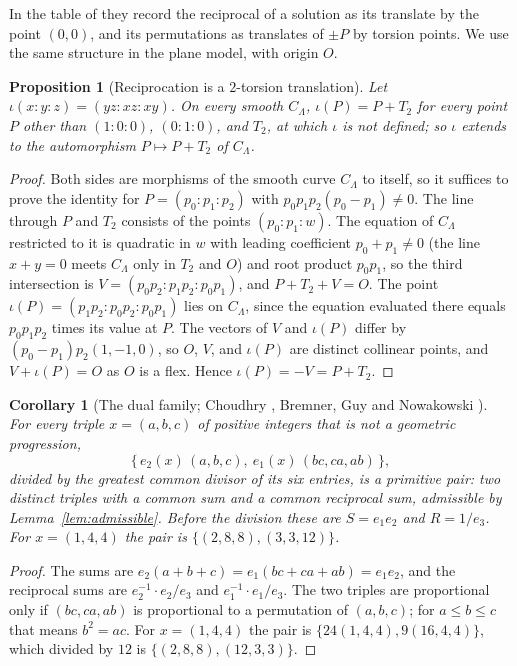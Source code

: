\documentclass[11pt]{amsart}
\newtheorem{proposition}[theorem]{Proposition}
\newtheorem{corollary}[theorem]{Corollary}
\theoremstyle{definition}
\theoremstyle{remark}
\begin{document}
In the table of \cite[\S4, p.~120]{bgn1993} they record the reciprocal of a solution as its translate by the point $(0,0)$, and its permutations as translates of $\pm P$ by torsion points. We use the same structure in the plane model, with origin $O$.

\begin{proposition}[Reciprocation is a $2$-torsion translation]\label{prop:dual}
Let $\iota(x:y:z)=(yz:xz:xy)$. On every smooth $C_\Lambda$, $\iota(P)=P+T_2$ for every point $P$ other than $(1:0:0)$, $(0:1:0)$, and $T_2$, at which $\iota$ is not defined; so $\iota$ extends to the automorphism $P\mapsto P+T_2$ of $C_\Lambda$.
\end{proposition}

\begin{proof}
Both sides are morphisms of the smooth curve $C_\Lambda$ to itself, so it suffices to prove the identity for $P=(p_0:p_1:p_2)$ with $p_0p_1p_2(p_0-p_1)\ne0$. The line through $P$ and $T_2$ consists of the points $(p_0:p_1:w)$. The equation of $C_\Lambda$ restricted to it is quadratic in $w$ with leading coefficient $p_0+p_1\ne0$ (the line $x+y=0$ meets $C_\Lambda$ only in $T_2$ and $O$) and root product $p_0p_1$, so the third intersection is $V=(p_0p_2:p_1p_2:p_0p_1)$, and $P+T_2+V=O$. The point $\iota(P)=(p_1p_2:p_0p_2:p_0p_1)$ lies on $C_\Lambda$, since the equation evaluated there equals $p_0p_1p_2$ times its value at $P$. The vectors of $V$ and $\iota(P)$ differ by $(p_0-p_1)p_2(1,-1,0)$, so $O$, $V$, and $\iota(P)$ are distinct collinear points, and $V+\iota(P)=O$ as $O$ is a flex. Hence $\iota(P)=-V=P+T_2$.
\end{proof}

\begin{corollary}[{The dual family; Choudhry \cite[\S4.1, p.~748]{choudhry2011}, Bremner, Guy and Nowakowski \cite[p.~117]{bgn1993}}]\label{cor:dual}
For every triple $x=(a,b,c)$ of positive integers that is not a geometric progression,
\[
  \big\{\,e_2(x)\,(a,b,c),\ e_1(x)\,(bc,ca,ab)\,\big\},
\]
divided by the greatest common divisor of its six entries, is a primitive pair: two distinct triples with a common sum and a common reciprocal sum, admissible by Lemma~\ref{lem:admissible}. Before the division these are $S=e_1e_2$ and $R=1/e_3$. For $x=(1,4,4)$ the pair is $\{(2,8,8),(3,3,12)\}$.
\end{corollary}

\begin{proof}
The sums are $e_2(a+b+c)=e_1(bc+ca+ab)=e_1e_2$, and the reciprocal sums are $e_2^{-1}\cdot e_2/e_3$ and $e_1^{-1}\cdot e_1/e_3$. The two triples are proportional only if $(bc,ca,ab)$ is proportional to a permutation of $(a,b,c)$; for $a\le b\le c$ that means $b^2=ac$. For $x=(1,4,4)$ the pair is $\{24(1,4,4),9(16,4,4)\}$, which divided by $12$ is $\{(2,8,8),(12,3,3)\}$.
\end{proof}
\end{document}
